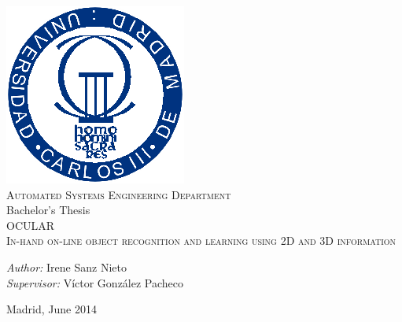 \begin{titlepage}
\begin{center}

 \includegraphics[size=0.8]{img/uc3m.eps}  \\[0.5 cm]

\large \textsc{Automated Systems Engineering Department} \\ [1 cm]

\large Bachelor's Thesis\\[1 cm]
\Huge \textsc{OCULAR} \\[1 cm]
\huge \textsc{In-hand on-line object recognition and learning using 2D and 3D information}\\[10 cm]


\begin{flushleft} \Large
\emph{Author:} Irene Sanz Nieto\\[0.5 cm]
\emph{Supervisor:} Víctor González Pacheco \\

\end{flushleft}

\vfill

{\large Madrid, June 2014}

\end{center}
\end{titlepage}
